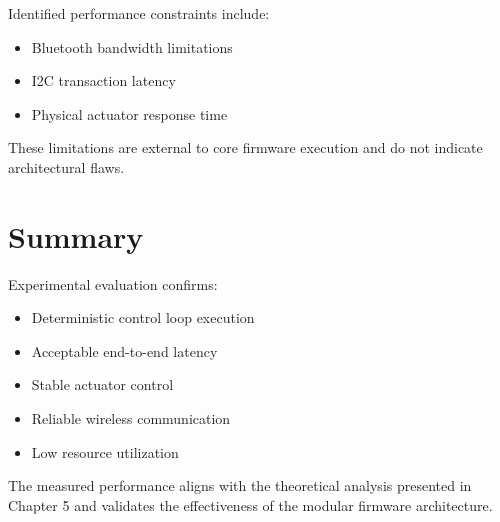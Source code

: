 Identified performance constraints include:

\begin{itemize}
	\item Bluetooth bandwidth limitations
	\item I2C transaction latency
	\item Physical actuator response time
\end{itemize}

These limitations are external to core firmware execution and do not indicate architectural flaws.


\section{Summary}

Experimental evaluation confirms:

\begin{itemize}
	\item Deterministic control loop execution
	\item Acceptable end-to-end latency
	\item Stable actuator control
	\item Reliable wireless communication
	\item Low resource utilization
\end{itemize}

The measured performance aligns with the theoretical analysis presented in Chapter 5 and validates the effectiveness of the modular firmware architecture.